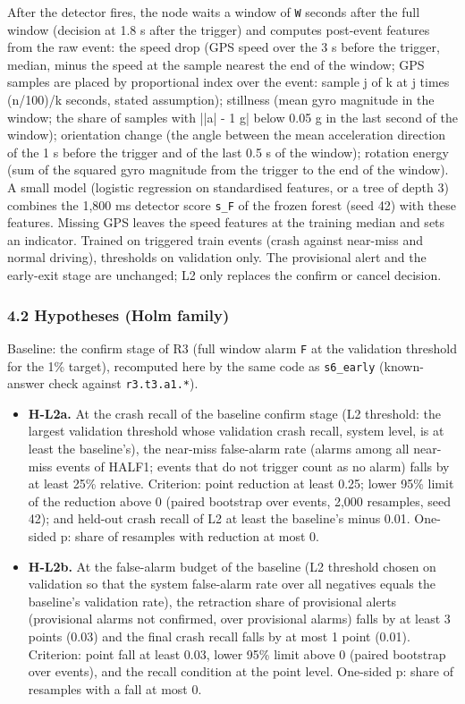 After the detector fires, the node waits a window of \texttt{W} seconds after the full window (decision at 1.8 s after the trigger) and computes post-event features from the raw event: the speed drop (GPS speed over the 3 s before the trigger, median, minus the speed at the sample nearest the end of the window; GPS samples are placed by proportional index over the event: sample j of k at j times (n/100)/k seconds, stated assumption); stillness (mean gyro magnitude in the window; the share of samples with ||a| - 1 g| below 0.05 g in the last second of the window); orientation change (the angle between the mean acceleration direction of the 1 s before the trigger and of the last 0.5 s of the window); rotation energy (sum of the squared gyro magnitude from the trigger to the end of the window). A small model (logistic regression on standardised features, or a tree of depth 3) combines the 1,800 ms detector score \texttt{s\_F} of the frozen forest (seed 42) with these features. Missing GPS leaves the speed features at the training median and sets an indicator. Trained on triggered train events (crash against near-miss and normal driving), thresholds on validation only. The provisional alert and the early-exit stage are unchanged; L2 only replaces the confirm or cancel decision.

\subsubsection*{4.2 Hypotheses (Holm family)}

Baseline: the confirm stage of R3 (full window alarm \texttt{F} at the validation threshold for the 1\% target), recomputed here by the same code as \texttt{s6\_early} (known-answer check against \texttt{r3.t3.a1.*}).

\begin{itemize}
\item \textbf{H-L2a.} At the crash recall of the baseline confirm stage (L2 threshold: the largest validation threshold whose validation crash recall, system level, is at least the baseline's), the near-miss false-alarm rate (alarms among all near-miss events of HALF1; events that do not trigger count as no alarm) falls by at least 25\% relative. Criterion: point reduction at least 0.25; lower 95\% limit of the reduction above 0 (paired bootstrap over events, 2,000 resamples, seed 42); and held-out crash recall of L2 at least the baseline's minus 0.01. One-sided p: share of resamples with reduction at most 0.
\item \textbf{H-L2b.} At the false-alarm budget of the baseline (L2 threshold chosen on validation so that the system false-alarm rate over all negatives equals the baseline's validation rate), the retraction share of provisional alerts (provisional alarms not confirmed, over provisional alarms) falls by at least 3 points (0.03) and the final crash recall falls by at most 1 point (0.01). Criterion: point fall at least 0.03, lower 95\% limit above 0 (paired bootstrap over events), and the recall condition at the point level. One-sided p: share of resamples with a fall at most 0.
\end{itemize}

